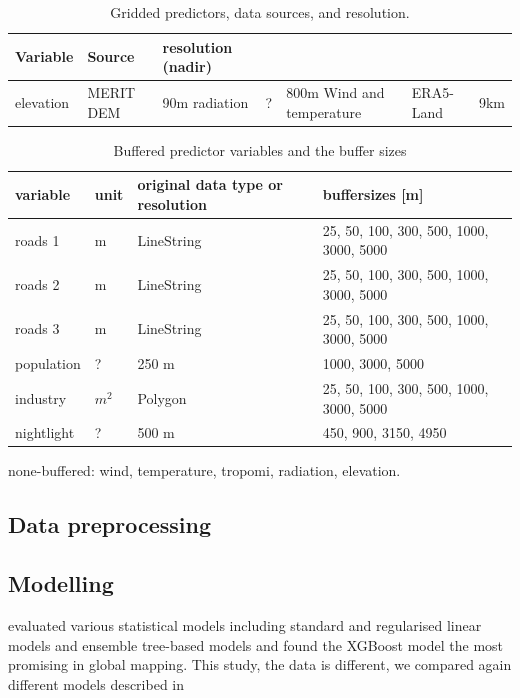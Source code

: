 \documentclass{article}
\begin{document}
\begin{table}\centering
\caption{Gridded predictors, data sources, and resolution.}
\label{tab-buff-pred}
\begin{tabular}{@{}lll@{}}\toprule
Variable&Source & resolution (nadir) \\ \midrule
 
elevation & MERIT DEM&  90m
radiation &?&	800m 
Wind and temperature & ERA5-Land &  9km


\bottomrule
\end{tabular}
\end{table}

 
\begin{table}\centering
\caption{Buffered predictor variables and the buffer sizes}
\label{tab-buff-pred}
\begin{tabular}{@{}llll@{}}\toprule
variable & unit & original data type or resolution& buffersizes [m] \\ \midrule
roads 1 & m &LineString&25, 50, 100, 300, 500, 1000, 3000, 5000 \\
roads 2 & m& LineString&25, 50, 100, 300, 500, 1000, 3000, 5000 \\
roads 3 & m& LineString&25, 50, 100, 300, 500, 1000, 3000, 5000 \\
population  &? &250 m & 1000, 3000, 5000 \\
industry  & $m^2$&Polygon & 25, 50, 100, 300, 500, 1000, 3000, 5000\\
nightlight   & ?& 500 m& 450, 900, 3150, 4950\\
\bottomrule
\end{tabular}
\end{table}

none-buffered: wind, temperature, tropomi, radiation, elevation.

\subsection{Data preprocessing}

\subsection{Modelling}

 
\cite{LU2020105856} evaluated various statistical models including standard and regularised linear models and ensemble tree-based models and found the XGBoost model the most promising in global mapping. This study, the data is different, we compared again different models described in \cite{LU2020105856}
\end{document}
